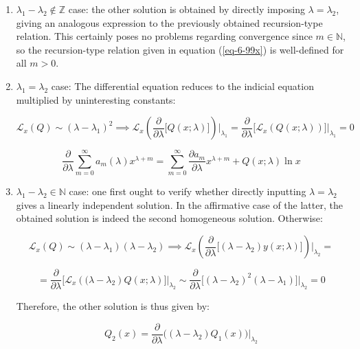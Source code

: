 \begin{enumerate}
    \item $\lambda_1-\lambda_2\notin\mathbb{Z}$ case: the other solution is obtained by directly imposing $\lambda=\lambda_2$, giving an analogous expression to the previously obtained recursion-type relation. This certainly poses no problems regarding convergence since $m\in\mathbb{N}$, so the recursion-type relation given in equation (\ref{eq-6-99x}) is well-defined for all $m>0$.

    \item $\lambda_1=\lambda_2$ case: The differential equation reduces to the indicial equation multiplied by uninteresting constants:

    \begin{equation}
        \mathcal{L}_x(Q)\sim(\lambda-\lambda_1)^2\implies\mathcal{L}_x\left(\frac{\partial}{\partial\lambda}\Big[Q(x;\lambda)\Big]\right)\biggr|_{\lambda_1}=\frac{\partial}{\partial\lambda}\Big[\mathcal{L}_x(Q(x;\lambda))\Big]\biggr|_{\lambda_1}=0
    \end{equation}

    \begin{equation}
        \frac{\partial}{\partial\lambda}\sum_{m=0}^\infty a_m(\lambda)x^{\lambda+m}=\sum_{m=0}^\infty\frac{\partial a_m}{\partial\lambda}x^{\lambda+m}+Q(x;\lambda)\ln{x}
    \end{equation}

    \item $\lambda_1-\lambda_2\in\mathbb{N}$ case: one first ought to verify whether directly inputting $\lambda=\lambda_2$ gives a linearly independent solution. In the affirmative case of the latter, the obtained solution is indeed the second homogeneous solution. Otherwise:

    \begin{equation*}
        \mathcal{L}_x(Q)\sim(\lambda-\lambda_1)(\lambda-\lambda_2)\implies\mathcal{L}_x\left(\frac{\partial}{\partial\lambda}\Big[(\lambda-\lambda_2)y(x;\lambda)\Big]\right)\biggr|_{\lambda_2}=
    \end{equation*}
    
    \begin{equation}
        =\frac{\partial}{\partial\lambda}\Big[\mathcal{L}_x\left((\lambda-\lambda_2\right)Q(x;\lambda)\Big]\biggr|_{\lambda_2}\sim\frac{\partial}{\partial\lambda}\Big[(\lambda-\lambda_2)^2(\lambda-\lambda_1)\Big]\biggr|_{\lambda_2}=0
    \end{equation}

    Therefore, the other solution is thus given by:

    \begin{equation}
        \label{eq-6-104xxx}
        Q_2(x)=\frac{\partial}{\partial\lambda}\Big((\lambda-\lambda_2)Q_1(x)\Big)\biggr|_{\lambda_2}
    \end{equation}
\end{enumerate}

